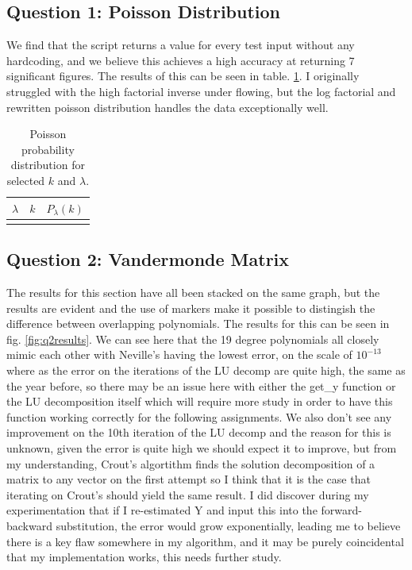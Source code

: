 \documentclass{article}
\begin{document}
\subsection*{Question 1: Poisson Distribution}

We find that the script returns a value for every test input without any hardcoding, and we believe this achieves a high accuracy at returning 7 significant figures. The results of this can be seen in table. \ref{tab:poisson}. I originally struggled with the high factorial inverse under flowing, but the log factorial and rewritten poisson distribution handles the data exceptionally well.

\begin{table}[H]
\centering
\caption{Poisson probability distribution for selected $k$ and $\lambda$.}
\label{tab:poisson}
\begin{tabular}{|c|c|c|}
\hline
$\lambda$ & $k$ & $P_\lambda(k)$ \\
\hline
\\
\hline
\end{tabular}
\end{table}

\subsection*{Question 2: Vandermonde Matrix}

The results for this section have all been stacked on the same graph, but the results are evident and the use of markers make it possible to distingish the difference between overlapping polynomials. The results for this can be seen in fig. \ref{fig:q2results}. We can see here that the 19 degree polynomials all closely mimic each other with Neville's having the lowest error, on the scale of $10^{-13}$ where as the error on the iterations of the LU decomp are quite high, the same as the year before, so there may be an issue here with either the get\_y function or the LU decomposition itself which will require more study in order to have this function working correctly for the following assignments. We also don't see any improvement on the 10th iteration of the LU decomp and the reason for this is unknown, given the error is quite high we should expect it to improve, but from my understanding, Crout's algortithm finds the solution decomposition of a matrix to any vector on the first attempt so I think that it is the case that iterating on Crout's should yield the same result. I did discover during my experimentation that if I re-estimated Y and input this into the forward-backward substitution, the error would grow exponentially, leading me to believe there is a key flaw somewhere in my algorithm, and it may be purely coincidental that my implementation works, this needs further study.
\end{document}
